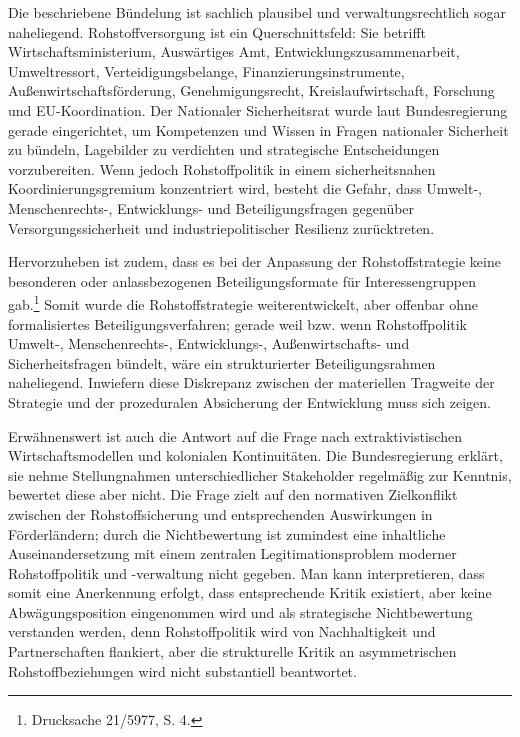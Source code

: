 \documentclass[12pt,a4paper,oneside]{book} %
\begin{document}
Die beschriebene Bündelung ist sachlich plausibel und verwaltungsrechtlich sogar naheliegend. Rohstoffversorgung ist ein Querschnittsfeld: Sie betrifft Wirtschaftsministerium, Auswärtiges Amt, Entwicklungszusammenarbeit, Umweltressort, Verteidigungsbelange, Finanzierungsinstrumente, Außenwirtschaftsförderung, Genehmigungsrecht, Kreislaufwirtschaft, Forschung und EU-Koordination. Der Nationaler Sicherheitsrat wurde laut Bundesregierung gerade eingerichtet, um Kompetenzen und Wissen in Fragen nationaler Sicherheit zu bündeln, Lagebilder zu verdichten und strategische Entscheidungen vorzubereiten. Wenn jedoch Rohstoffpolitik in einem sicherheitsnahen Koordinierungsgremium konzentriert wird, besteht die Gefahr, dass Umwelt-, Menschenrechts-, Entwicklungs- und Beteiligungsfragen gegenüber Versorgungssicherheit und industriepolitischer Resilienz zurücktreten.

Hervorzuheben ist zudem, dass es bei der Anpassung der Rohstoffstrategie keine besonderen oder anlassbezogenen Beteiligungsformate für Interessengruppen gab.\footnote{Drucksache 21/5977, S. 4.} Somit wurde die Rohstoffstrategie weiterentwickelt, aber offenbar ohne formalisiertes Beteiligungsverfahren; gerade weil bzw. wenn Rohstoffpolitik Umwelt-, Menschenrechts-, Entwicklungs-, Außenwirtschafts- und Sicherheitsfragen bündelt, wäre ein strukturierter Beteiligungsrahmen naheliegend. Inwiefern diese Diskrepanz zwischen der materiellen Tragweite der Strategie und der prozeduralen Absicherung der Entwicklung muss sich zeigen.

Erwähnenswert ist auch die Antwort auf die Frage nach extraktivistischen Wirtschaftsmodellen und kolonialen Kontinuitäten. Die Bundesregierung erklärt, sie nehme Stellungnahmen unterschiedlicher Stakeholder regelmäßig zur Kenntnis, \glqq bewertet diese aber nicht\grqq. Die Frage zielt auf den normativen Zielkonflikt zwischen der Rohstoffsicherung und entsprechenden Auswirkungen in Förderländern; durch die Nichtbewertung ist zumindest eine inhaltliche Auseinandersetzung mit einem zentralen Legitimationsproblem moderner Rohstoffpolitik und -verwaltung nicht gegeben. Man kann interpretieren, dass somit eine Anerkennung erfolgt, dass entsprechende Kritik existiert, aber keine Abwägungsposition eingenommen wird und als strategische Nichtbewertung verstanden werden, denn Rohstoffpolitik wird von Nachhaltigkeit und Partnerschaften flankiert,  aber die strukturelle Kritik an asymmetrischen Rohstoffbeziehungen wird nicht substantiell beantwortet.
\end{document}
